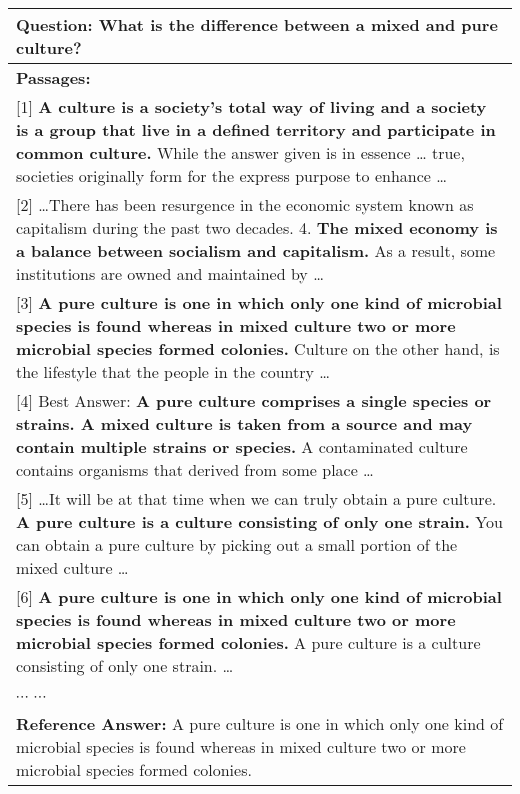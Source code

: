 \begin{table*}[htbp]
\small
\centering
\renewcommand{\arraystretch}{1.2}
\begin{tabular}{p{\textwidth}}
\hline
\textbf{Question: } What is the difference between a mixed and pure culture? \\
\hline
\textbf{Passages:} \\

[1] \textbf{A culture is a society's total way of living and a society is a group that live in a defined territory and participate in common culture.} While the answer given is in essence … true, societies originally form for the express purpose to enhance \ldots \\

[2] \ldots There has been resurgence in the economic system known as capitalism during the past two decades. 4. \textbf{The mixed economy is a balance between socialism and capitalism.} As a result, some institutions are owned and maintained by \ldots \\

[3] \textbf{A pure culture is one in which only one kind of microbial species is found whereas in mixed culture two or more microbial species formed colonies.} Culture on the other hand, is the lifestyle that the people in the country \ldots \\

[4] Best Answer: \textbf{A pure culture comprises a single species or strains. A mixed culture is taken from a source and may contain multiple strains or species.} A contaminated culture contains organisms that derived from some place \ldots \\

[5] \ldots It will be at that time when we can truly obtain a pure culture. \textbf{A pure culture is a culture consisting of only one strain.} You can obtain a pure culture by picking out a small portion of the mixed culture \ldots \\

[6] \textbf{A pure culture is one in which only one kind of microbial species is found whereas in mixed culture two or more microbial species formed colonies.} A pure culture is a culture consisting of only one strain. \ldots \\

$\cdots$ $\cdots$ \\
\hline
\textbf{Reference Answer:} A pure culture is one in which only one kind of microbial species is found whereas in mixed culture two or more microbial species formed colonies. \\
\hline
\end{tabular}
\caption{An example from MS-MARCO. The text in bold is the predicted answer candidate from each passage according to the boundary model. The candidate from [1] is chosen as the final answer by this model, while the correct answer is from [6] and can be verified by the answers from [3], [4], [5]. } \label{tab:example}
\end{table*}



